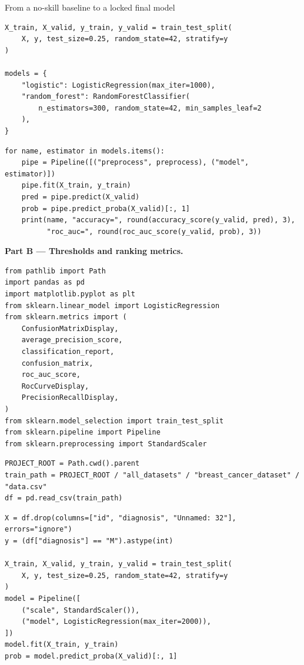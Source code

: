 \begin{labproject}{From a no-skill baseline to a locked final model}
\begin{lstlisting}[style=mlpython]
X_train, X_valid, y_train, y_valid = train_test_split(
    X, y, test_size=0.25, random_state=42, stratify=y
)

models = {
    "logistic": LogisticRegression(max_iter=1000),
    "random_forest": RandomForestClassifier(
        n_estimators=300, random_state=42, min_samples_leaf=2
    ),
}
\end{lstlisting}

\begin{lstlisting}[style=mlpython]
for name, estimator in models.items():
    pipe = Pipeline([("preprocess", preprocess), ("model", estimator)])
    pipe.fit(X_train, y_train)
    pred = pipe.predict(X_valid)
    prob = pipe.predict_proba(X_valid)[:, 1]
    print(name, "accuracy=", round(accuracy_score(y_valid, pred), 3),
          "roc_auc=", round(roc_auc_score(y_valid, prob), 3))
\end{lstlisting}

\medskip\noindent\textbf{Part B --- Thresholds and ranking metrics.}\par
\begin{lstlisting}[style=mlpython]
from pathlib import Path
import pandas as pd
import matplotlib.pyplot as plt
from sklearn.linear_model import LogisticRegression
from sklearn.metrics import (
    ConfusionMatrixDisplay,
    average_precision_score,
    classification_report,
    confusion_matrix,
    roc_auc_score,
    RocCurveDisplay,
    PrecisionRecallDisplay,
)
from sklearn.model_selection import train_test_split
from sklearn.pipeline import Pipeline
from sklearn.preprocessing import StandardScaler
\end{lstlisting}

\begin{lstlisting}[style=mlpython]
PROJECT_ROOT = Path.cwd().parent
train_path = PROJECT_ROOT / "all_datasets" / "breast_cancer_dataset" / "data.csv"
df = pd.read_csv(train_path)
\end{lstlisting}

\begin{lstlisting}[style=mlpython]
X = df.drop(columns=["id", "diagnosis", "Unnamed: 32"], errors="ignore")
y = (df["diagnosis"] == "M").astype(int)

X_train, X_valid, y_train, y_valid = train_test_split(
    X, y, test_size=0.25, random_state=42, stratify=y
)
model = Pipeline([
    ("scale", StandardScaler()),
    ("model", LogisticRegression(max_iter=2000)),
])
model.fit(X_train, y_train)
prob = model.predict_proba(X_valid)[:, 1]
\end{lstlisting}


\end{labproject}
